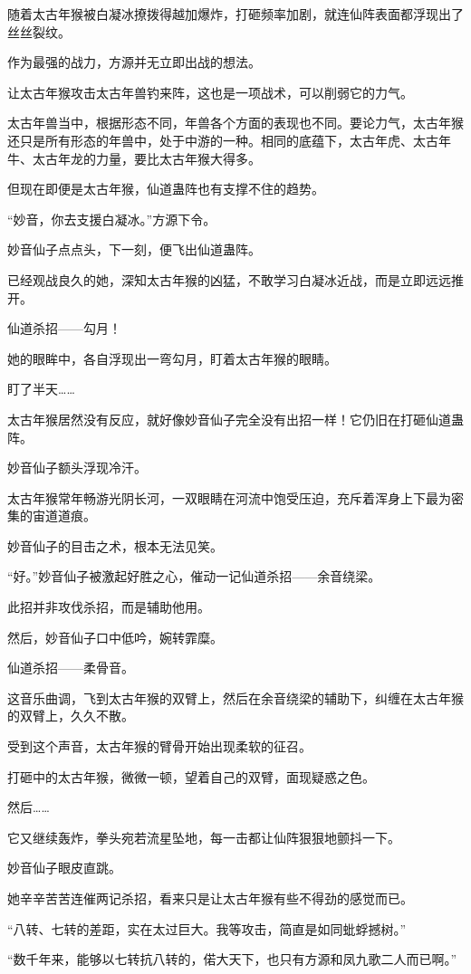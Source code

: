 \begin{this_body}
随着太古年猴被白凝冰撩拨得越加爆炸，打砸频率加剧，就连仙阵表面都浮现出了丝丝裂纹。

作为最强的战力，方源并无立即出战的想法。

让太古年猴攻击太古年兽钓来阵，这也是一项战术，可以削弱它的力气。

太古年兽当中，根据形态不同，年兽各个方面的表现也不同。要论力气，太古年猴还只是所有形态的年兽中，处于中游的一种。相同的底蕴下，太古年虎、太古年牛、太古年龙的力量，要比太古年猴大得多。

但现在即便是太古年猴，仙道蛊阵也有支撑不住的趋势。

“妙音，你去支援白凝冰。”方源下令。

妙音仙子点点头，下一刻，便飞出仙道蛊阵。

已经观战良久的她，深知太古年猴的凶猛，不敢学习白凝冰近战，而是立即远远推开。

仙道杀招——勾月！

她的眼眸中，各自浮现出一弯勾月，盯着太古年猴的眼睛。

盯了半天……

太古年猴居然没有反应，就好像妙音仙子完全没有出招一样！它仍旧在打砸仙道蛊阵。

妙音仙子额头浮现冷汗。

太古年猴常年畅游光阴长河，一双眼睛在河流中饱受压迫，充斥着浑身上下最为密集的宙道道痕。

妙音仙子的目击之术，根本无法见笑。

“好。”妙音仙子被激起好胜之心，催动一记仙道杀招——余音绕梁。

此招并非攻伐杀招，而是辅助他用。

然后，妙音仙子口中低吟，婉转霏糜。

仙道杀招——柔骨音。

这音乐曲调，飞到太古年猴的双臂上，然后在余音绕梁的辅助下，纠缠在太古年猴的双臂上，久久不散。

受到这个声音，太古年猴的臂骨开始出现柔软的征召。

打砸中的太古年猴，微微一顿，望着自己的双臂，面现疑惑之色。

然后……

它又继续轰炸，拳头宛若流星坠地，每一击都让仙阵狠狠地颤抖一下。

妙音仙子眼皮直跳。

她辛辛苦苦连催两记杀招，看来只是让太古年猴有些不得劲的感觉而已。

“八转、七转的差距，实在太过巨大。我等攻击，简直是如同蚍蜉撼树。”

“数千年来，能够以七转抗八转的，偌大天下，也只有方源和凤九歌二人而已啊。”


\end{this_body}
